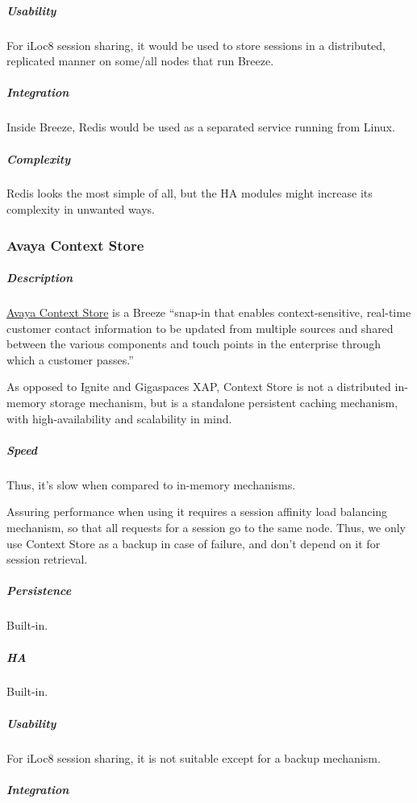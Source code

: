 \documentclass{article}
\begin{document}
	\subparagraph*{Usability}
	
	For iLoc8 session sharing, it would be used to store sessions in a distributed, replicated manner on some/all nodes that run Breeze.
	
	\subparagraph*{Integration}
	
	Inside Breeze, Redis would be used as a separated service running from Linux.
	
	\subparagraph*{Complexity}
	
	Redis looks the most simple of all, but the HA modules might increase its complexity in unwanted ways.
	
	\subsubsection{Avaya Context Store}
	
	\subparagraph*{Description}
	
	\href{https://www.devconnectprogram.com/site/global/products_resources/avaya_breeze/avaya_snap_ins/context_store/overview/index.gsp}{Avaya Context Store} is a Breeze ``snap-in that enables context-sensitive, real-time customer contact information to be updated from multiple sources and shared between the various components and touch points in the enterprise through which a customer passes.''
	
	As opposed to Ignite and Gigaspaces XAP, Context Store is not a distributed in-memory storage mechanism, but is a standalone persistent caching mechanism, with high-availability and scalability in mind.
	
	\subparagraph*{Speed}
	
	Thus, it's slow when compared to in-memory mechanisms.
	
	Assuring performance when using it requires a session affinity load balancing mechanism, so that all requests for a session go to the same node. Thus, we only use Context Store as a backup in case of failure, and don't depend on it for session retrieval.
	
	\subparagraph*{Persistence}
	
	Built-in.
	
	\subparagraph*{HA}
	
	Built-in.
	
	\subparagraph*{Usability}
	
	For iLoc8 session sharing, it is not suitable except for a backup mechanism.
	
	\subparagraph*{Integration}
	
\end{document}

